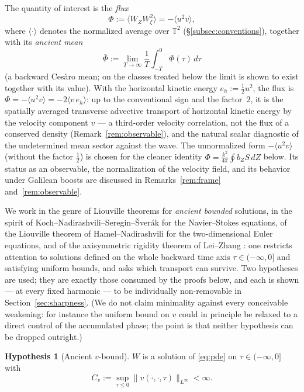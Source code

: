 \documentclass[11pt]{amsart}
\theoremstyle{definition}
\newtheorem{hypothesis}[theorem]{Hypothesis}
\theoremstyle{remark}
\newcommand{\T}{\mathbb{T}}
\newcommand{\Fbar}{\bar\Phi}
\newcommand{\mean}[1]{\langle #1\rangle}
\begin{document}
The quantity of interest is the \emph{flux}
\begin{equation}\label{eq:flux}
  \Phi:=\mean{W_ZW_\xi^2}=-\mean{u^2v},
\end{equation}
where $\mean{\cdot}$ denotes the normalized average over $\T^2$
(\S\ref{subsec:conventions}), together with its \emph{ancient mean}
\begin{equation}\label{eq:fmean}
  \Fbar:=\lim_{T\to\infty}\frac1T\int_{-T}^0\Phi(\tau)\,d\tau
\end{equation}
(a backward Ces\`aro mean; on the classes treated below the limit is
shown to exist together with its value). With the horizontal kinetic
energy $e_h:=\tfrac12u^2$, the flux is
$\Phi=-\mean{u^2v}=-2\mean{v\,e_h}$: up to the conventional sign and the
factor~$2$, it is the spatially averaged transverse advective transport of
horizontal kinetic energy by the velocity component $v$ --- a third-order
velocity correlation, not the flux of a conserved density
(Remark~\ref{rem:observable}), and the natural scalar diagnostic of the
undetermined mean sector against the wave. The unnormalized form
$-\mean{u^2v}$ (without the factor $\tfrac12$) is chosen for the cleaner
identity $\Phi=\tfrac{k^2}{4\pi}\oint b_ZS\,dZ$ below. Its status as an
observable, the normalization of the velocity field, and its behavior
under Galilean boosts are discussed in
Remarks~\ref{rem:frame} and~\ref{rem:observable}.

We work in the genre of Liouville theorems for \emph{ancient bounded}
solutions, in the spirit of Koch--Nadirashvili--Seregin--\v Sver\'ak
\cite{KNSS2009} for the Navier--Stokes equations, of the Liouville
theorem of Hamel--Nadirashvili \cite{HamelNadirashvili2019} for the
two-dimensional Euler equations, and of the axisymmetric
rigidity theorem of Lei--Zhang \cite{LeiZhang2011}: one restricts
attention to solutions defined on the whole backward time axis
$\tau\in(-\infty,0]$ and satisfying uniform bounds, and asks which
transport can survive. Two hypotheses are used; they are exactly those consumed by the proofs
below, and each is shown --- at every fixed harmonic --- to be
individually non-removable in Section~\ref{sec:sharpness}. (We do not
claim minimality against every conceivable weakening: for instance the
uniform bound on $v$ could in principle be relaxed to a direct control
of the accumulated phase; the point is that neither hypothesis can be
dropped outright.)

\begin{hypothesis}[Ancient $v$-bound]\label{hyp:v}
$W$ is a solution of \eqref{eq:pde} on $\tau\in(-\infty,0]$ with
\[
  C_v:=\sup_{\tau\le0}\|v(\cdot,\cdot,\tau)\|_{L^\infty}<\infty .
\]
\end{hypothesis}
\end{document}

